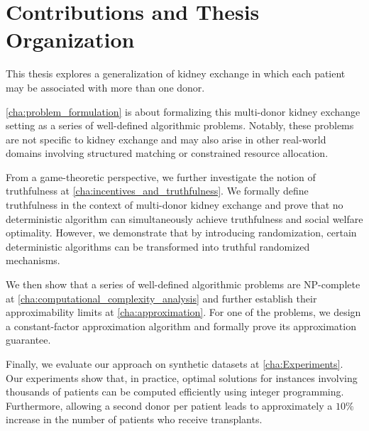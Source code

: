 \section{Contributions and Thesis Organization}

This thesis explores a generalization of kidney exchange in which each patient may be associated with more than one donor.

\autoref{cha:problem_formulation} is about formalizing this multi-donor kidney exchange setting as a series of well-defined algorithmic problems. Notably, these problems are not specific to kidney exchange and may also arise in other real-world domains involving structured matching or constrained resource allocation.

From a game-theoretic perspective, we further investigate the notion of truthfulness at \autoref{cha:incentives_and_truthfulness}.  We formally define truthfulness in the context of multi-donor kidney exchange and prove that no deterministic algorithm can simultaneously achieve truthfulness and social welfare optimality. However, we demonstrate that by introducing randomization, certain deterministic algorithms can be transformed into truthful randomized mechanisms.

We then show that a series of well-defined algorithmic problems are NP-complete at \autoref{cha:computational_complexity_analysis} and further establish their approximability limits at \autoref{cha:approximation}. For one of the problems, we design a constant-factor approximation algorithm and formally prove its approximation guarantee.


Finally, we evaluate our approach on synthetic datasets at \autoref{cha:Experiments}. Our experiments show that, in practice, optimal solutions for instances involving thousands of patients can be computed efficiently using integer programming. Furthermore, allowing a second donor per patient leads to approximately a $10\%$ increase in the number of patients who receive transplants.



